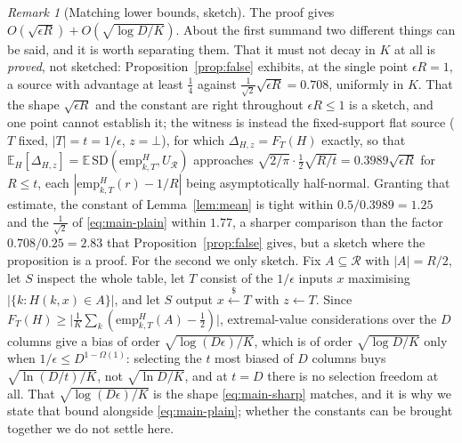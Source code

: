 \documentclass[11pt,a4paper]{article}
\theoremstyle{plain}
\theoremstyle{definition}
\theoremstyle{remark}
\newtheorem{remark}{Remark}
\newcommand{\sample}{\stackrel{{\scriptscriptstyle\$}}{\leftarrow}}
\newcommand{\SD}{\mathrm{SD}}
\newcommand{\calR}{\mathcal{R}}
\newcommand{\emp}{\mathrm{emp}}
\begin{document}
\begin{remark}[Matching lower bounds, sketch]\label{rem:tight}
The proof gives $O(\sqrt{\epsilon R}) + O(\sqrt{\log D/K})$. About the first summand two different
things can be said, and it is worth separating them. That it must not decay in $K$ at all is
\emph{proved}, not sketched: Proposition~\ref{prop:false} exhibits, at the single point
$\epsilon R = 1$, a source with advantage at least $\tfrac14$ against
$\tfrac{1}{\sqrt2}\sqrt{\epsilon R} = 0.708$, uniformly in $K$. That the shape $\sqrt{\epsilon R}$
and the constant are right throughout $\epsilon R \le 1$ is a sketch, and one point cannot
establish it; the witness is instead the fixed-support flat source ($T$ fixed, $|T| = t = 1/\epsilon$,
$z = \bot$), for which $\Delta_{H,z} = F_{T}(H)$ exactly, so that
$\mathbb{E}_{H}[\Delta_{H,z}] = \mathbb{E}\,\SD(\emp^{H}_{k,T},U_{\calR})$ approaches
$\sqrt{2/\pi}\cdot\tfrac12\sqrt{R/t} = 0.3989\sqrt{\epsilon R}$ for $R \le t$, each
$|\emp^{H}_{k,T}(r) - 1/R|$ being asymptotically half-normal. Granting that estimate, the constant
of Lemma~\ref{lem:mean} is tight within $0.5/0.3989 = 1.25$ and the $\tfrac{1}{\sqrt2}$ of
\eqref{eq:main-plain} within $1.77$, a sharper comparison than the factor
$0.708/0.25 = 2.83$ that Proposition~\ref{prop:false} gives, but a sketch where the proposition is
a proof.
For the second we only sketch. Fix $A \subseteq \calR$ with $|A| = R/2$, let $S$ inspect the whole
table, let $T$ consist of the $1/\epsilon$ inputs $x$ maximising $|\{k : H(k,x) \in A\}|$, and let
$S$ output $x \sample T$ with $z \leftarrow T$. Since
$F_T(H) \ge \bigl|\tfrac{1}{K}\sum_{k}(\emp^{H}_{k,T}(A) - \tfrac12)\bigr|$, extremal-value
considerations over the $D$ columns give a bias of order $\sqrt{\log(D\epsilon)/K}$, which is of
order $\sqrt{\log D/K}$ only when $1/\epsilon \le D^{1-\Omega(1)}$: selecting the $t$ most biased of
$D$ columns buys $\sqrt{\ln(D/t)/K}$, not $\sqrt{\ln D/K}$, and at $t = D$ there is no selection
freedom at all. That $\sqrt{\log(D\epsilon)/K}$ is the shape \eqref{eq:main-sharp} matches, and it is why we state that
bound alongside \eqref{eq:main-plain}; whether the constants can be brought together we do not
settle here.
\end{remark}
\end{document}
